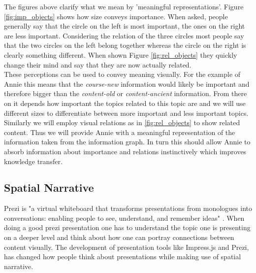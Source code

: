 \documentclass[twoside]{article}
\begin{document}
The figures above clarify what we mean by 'meaningful representations'. Figure \ref{fig:imp_objects} shows how size conveys importance. When asked, people generally say that the circle on the left is most important, the ones on the right are less important. Considering the relation of the three circles most people say that the two circles on the left belong together whereas the circle on the right is clearly something different. When shown Figure \ref{fig:rel_objects} they quickly change their mind and say that they are now actually related.\\

These perceptions can be used to convey meaning visually. For the example of Annie this means that the \textit{course-new} information would likely be important and therefore bigger than the \textit{content-old} or \textit{content-ancient} information. From there on it depends how important the topics related to this topic are and we will use different sizes to differentiate between more important and less important topics. Similarly we will employ visual relations as in \ref{fig:rel_objects} to show related content. Thus we will provide Annie with a meaningful representation of the information taken from the information graph. In turn this should allow Annie to absorb information about importance and relations instinctively which improves knowledge transfer.\\


\subsection{Spatial Narrative}
\label{sec:spatialnarrative}

Prezi is "a virtual whiteboard that transforms presentations from monologues into conversations: enabling people to see, understand, and remember ideas" \cite{Prezi:npentrel14}. When doing a good prezi presentation one has to understand the topic one is presenting on a deeper level and think about how one can portray connections between content visually. The development of presentation tools like Impress.js and Prezi, has changed how people think about presentations while making use of spatial narrative.\\
\end{document}
